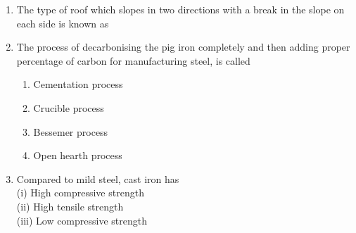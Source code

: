 \documentclass[11pt,a4paper]{article}
\begin{document}
\begin{enumerate}
{}
\\
\item{The type of roof which slopes in two directions with a break in the slope on each side is known as}
\\
\item{The process of decarbonising the pig iron completely and then adding proper percentage of carbon for manufacturing steel, is called}
\begin{enumerate}[label=\Alph*.]
\item{Cementation process}
\item{Crucible process}
\item{Bessemer process}
\item{Open hearth process}
\end{enumerate}
\item{Compared to mild steel, cast iron has \\

(i) High compressive strength \\

(ii) High tensile strength \\

(iii) Low compressive strength \\

}
\end{enumerate}
\end{document}
